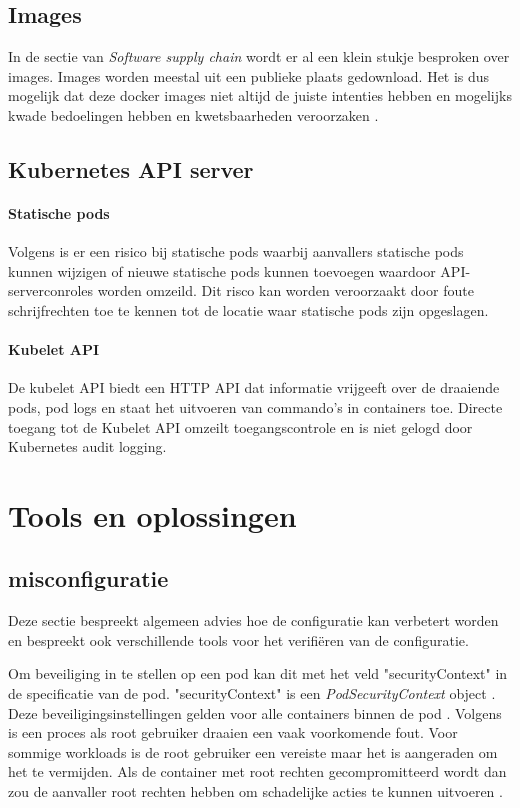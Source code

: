 \subsection{Images}
In de sectie van \textit{Software supply chain} wordt er al een klein stukje besproken over images. Images worden meestal uit een publieke plaats gedownload. Het is dus mogelijk dat deze docker images niet altijd de juiste intenties hebben en mogelijks kwade bedoelingen hebben en kwetsbaarheden veroorzaken \autocite{mytilinakis2020attack}. 

\subsection{Kubernetes API server}
\paragraph{Statische pods}
Volgens \textcite{KubernetesDocs-2023} is er een risico bij statische pods waarbij aanvallers statische pods kunnen wijzigen of nieuwe statische pods kunnen toevoegen waardoor API-serverconroles worden omzeild. 
Dit risco kan worden veroorzaakt door foute schrijfrechten toe te kennen tot de locatie waar statische pods zijn opgeslagen.

\paragraph{Kubelet API}
De kubelet API biedt een HTTP API dat informatie vrijgeeft over de draaiende pods, pod logs en staat het uitvoeren van commando's in containers toe.
Directe toegang tot de Kubelet API omzeilt toegangscontrole en is niet gelogd door Kubernetes audit logging.


\section{Tools en oplossingen}

\subsection{misconfiguratie}
Deze sectie bespreekt algemeen advies hoe de configuratie kan verbetert worden en bespreekt ook verschillende tools voor het verifiëren van de configuratie.\newline

Om beveiliging in te stellen op een pod kan dit met het veld "securityContext" in de specificatie van de pod. "securityContext" is een \textit{PodSecurityContext} object \autocite{KubernetesDocs-2023}. 
Deze beveiligingsinstellingen gelden voor alle containers binnen de pod \autocite{KubernetesDocs-2023}. 
Volgens \textcite{OWASP-2023} is een proces als root gebruiker draaien een vaak voorkomende fout. Voor sommige workloads is de root gebruiker een vereiste maar het is aangeraden om het te vermijden. Als de container met root rechten gecompromitteerd wordt dan zou de aanvaller root rechten hebben om schadelijke acties te kunnen uitvoeren \autocite{OWASP-2023}.  

